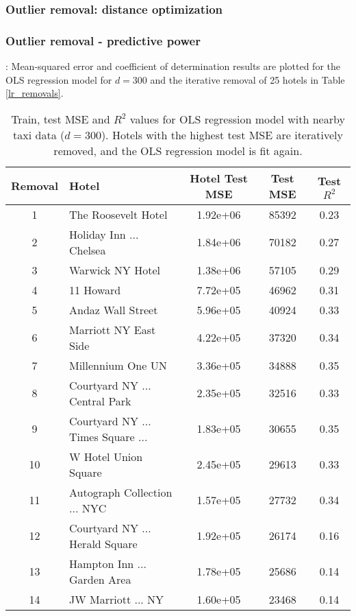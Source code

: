 \documentclass[useAMS, usenatbib]{biom}
\begin{document}
\subsubsection{Outlier removal: distance optimization}


\subsubsection{Outlier removal - predictive power}: Mean-squared error and coefficient of determination results are plotted for the OLS regression model for $d = 300$ and the iterative removal of 25 hotels in Table \ref{lr_removals}.

\begin{table}
\caption{Train, test MSE and $R^2$ values for OLS regression model with nearby taxi data ($d = 300$). Hotels with the highest test MSE are iteratively removed, and the OLS regression model is fit again.}
\label{t:lr_removals}
\begin{center}
\resizebox{\columnwidth}{!}
{
 \begin{tabular}{||c|l|c|c|c||}
\hline
Removal & Hotel & Hotel Test MSE & Test MSE & Test $R^2 $ \\
\hline
1 & The Roosevelt Hotel & 1.92e+06 & 85392 &  0.23 \\
2 & Holiday Inn ... Chelsea & 1.84e+06 & 70182 &  0.27 \\
3 & Warwick NY Hotel & 1.38e+06 & 57105 &  0.29 \\
4 & 11 Howard & 7.72e+05 & 46962 &  0.31 \\
5 & Andaz Wall Street & 5.96e+05 & 40924 &  0.33 \\
6 & Marriott NY East Side & 4.22e+05 & 37320 &  0.34 \\
7 & Millennium One UN & 3.36e+05 & 34888 &  0.35 \\
8 & Courtyard NY ... Central Park & 2.35e+05 & 32516 &  0.33 \\
9 & Courtyard NY ... Times Square ... & 1.83e+05 & 30655 &  0.35 \\
10 & W Hotel Union Square & 2.45e+05 & 29613 &  0.33 \\
11 & Autograph Collection ... NYC & 1.57e+05 & 27732 &  0.34 \\
12 & Courtyard NY ... Herald Square & 1.92e+05 & 26174 &  0.16 \\
13 & Hampton Inn ... Garden Area & 1.78e+05 & 25686 &  0.14 \\
14 & JW Marriott ... NY & 1.60e+05 & 23468 &  0.14 \\

\end{tabular}}
\end{center}
\end{table}
\end{document}

